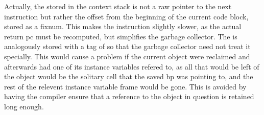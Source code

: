 Actually, the  stored in the context stack is not a raw pointer
to the next instruction but rather the offset from the beginning of
the current code block, stored as a fixnum.  This makes the
 instruction slightly slower, as the actual return pc must
be recomputed, but simplifies the garbage collector.  The  is
analogously stored with a tag of  so that the garbage
collector need not treat it specially.  This would cause a problem if
the current object were reclaimed and afterwards had one of its
instance variables refered to, as all that would be left of the object
would be the solitary cell that the saved bp was pointing to, and the
rest of the relevent instance variable frame would be gone.  This is
avoided by having the compiler ensure that a reference to the object
in question is retained long enough.
